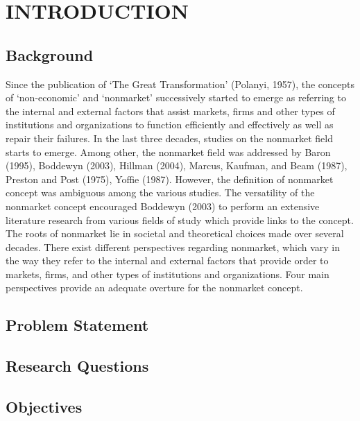 \documentclass[
]{mitthesis}
\author{}
\date{\vspace{-2.5em}}
\begin{document}
{
\setcounter{tocdepth}{2}
\tableofcontents
}
\hypertarget{introduction}{%
\section{INTRODUCTION}\label{introduction}}

\hypertarget{background}{%
\subsection{Background}\label{background}}

Since the publication of `The Great Transformation' (Polanyi, 1957), the concepts of `non-economic' and `nonmarket' successively started to emerge as referring to the internal and external factors that assist markets, firms and other types of institutions and organizations to function efficiently and effectively as well as repair their failures. In the last three decades, studies on the nonmarket field starts to emerge. Among other, the nonmarket field was addressed by Baron (1995), Boddewyn (2003), Hillman (2004), Marcus, Kaufman, and Beam (1987), Preston and Post (1975), Yoffie (1987). However, the definition of nonmarket concept was ambiguous among the various studies. The versatility of the nonmarket concept encouraged Boddewyn (2003) to perform an extensive literature research from various fields of study which provide links to the concept. The roots of nonmarket lie in societal and theoretical choices made over several decades. There exist different perspectives regarding nonmarket, which vary in the way they refer to the internal and external factors that provide order to markets, firms, and other types of institutions and organizations. Four main perspectives provide an adequate overture for the nonmarket concept.

\hypertarget{problem-statement}{%
\subsection{Problem Statement}\label{problem-statement}}

\hypertarget{research-questions}{%
\subsection{Research Questions}\label{research-questions}}

\hypertarget{objectives}{%
\subsection{Objectives}\label{objectives}}
\end{document}
